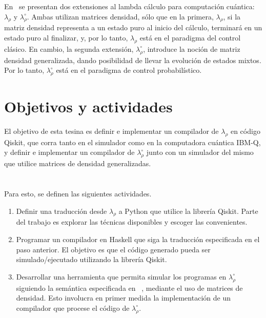 \documentclass[a4paper]{article}
\begin{document}
En~\cite{DiazcaroAPLAS17} se presentan dos extensiones al lambda cálculo para
computación cuántica: $\lambda_\rho$ y $\lambda_\rho^\circ$. Ambas utilizan
matrices densidad, sólo que en la primera, $\lambda_\rho$, si la matriz densidad representa a un
estado puro al inicio del cálculo, terminará en un estado puro al finalizar, y,
por lo tanto, $\lambda_\rho$ está en el paradigma del control clásico. En
cambio, la segunda extensión, $\lambda_\rho^\circ$, introduce la noción de
matriz densidad generalizada, dando posibilidad de llevar la evolución de
estados mixtos. Por lo tanto, $\lambda_\rho^\circ$ está en el paradigma de
control probabilístico.


\section*{Objetivos y actividades}
El objetivo de esta tesina es definir e implementar un compilador de
$\lambda_\rho$ en código Qiskit, que corra tanto en el simulador como en la
computadora cuántica IBM-Q, y definir e implementar un compilador de
$\lambda_\rho^\circ$ junto con un simulador del mismo que utilice matrices de densidad generalizadas.
\\
\\
\\
\newline
\newline
\newline
\newline
\newline
\newline
Para esto, se definen las siguientes actividades.
\begin{enumerate}
\item Definir una traducción desde $\lambda_\rho$ a
  Python que utilice la librería Qiskit. Parte del trabajo es explorar las técnicas disponibles y escoger las convenientes.
\item Programar un compilador en Haskell que siga la traducción especificada en el paso anterior. El objetivo es que el código generado pueda ser simulado/ejecutado utilizando la librería Qiskit.
\item Desarrollar una herramienta que permita simular los programas en $\lambda_\rho^\circ$ siguiendo la semántica especificada en ~\cite{DiazcaroAPLAS17}, mediante el uso de matrices de densidad. Esto involucra en primer medida la implementación de un compilador que procese el código de $\lambda_\rho^\circ$.
\end{enumerate}


 
\end{document}
